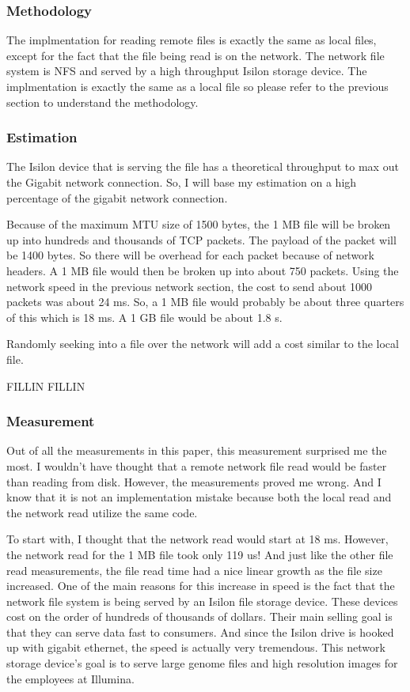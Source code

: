 \documentclass[paper=a4, fontsize=11pt]{scrartcl}
\numberwithin{equation}{section}        %
\numberwithin{figure}{section}          %
\numberwithin{table}{section}               %
\begin{document}
\subsubsection{Methodology}

The implmentation for reading remote files is exactly the same as local files, except for the fact that the file being read is on the network.  The network file system is NFS and served by a high throughput Isilon storage device.  The implmentation is exactly the same as a local file so please refer to the previous section to understand the methodology.

\subsubsection{Estimation}

The Isilon device that is serving the file has a theoretical throughput to max out the Gigabit network connection.  So, I will base my estimation on a high percentage of the gigabit network connection.

Because of the maximum MTU size of 1500 bytes, the 1 MB file will be broken up into hundreds and thousands of TCP packets.  The payload of the packet will be 1400 bytes.  So there will be overhead for each packet because of network headers.  A 1 MB file would then be broken up into about 750 packets.  Using the network speed in the previous network section, the cost to send about 1000 packets was about 24 ms.  So, a 1 MB file would probably be about three quarters of this which is 18 ms.  A 1 GB file would be about 1.8 s.

Randomly seeking into a file over the network will add a cost similar to the local file.

FILLIN FILLIN

\subsubsection{Measurement}

Out of all the measurements in this paper, this measurement surprised me the most.  I wouldn't have thought that a remote network file read would be faster than reading from disk.  However, the measurements proved me wrong.  And I know that it is not an implementation mistake because both the local read and the network read utilize the same code.

To start with, I thought that the network read would start at 18 ms.  However, the network read for the 1 MB file took only 119 us!  And just like the other file read measurements, the file read time had a nice linear growth as the file size increased.  One of the main reasons for this increase in speed is the fact that the network file system is being served by an Isilon file storage device.  These devices cost on the order of hundreds of thousands of dollars.  Their main selling goal is that they can serve data fast to consumers.  And since the Isilon drive is hooked up with gigabit ethernet, the speed is actually very tremendous.  This network storage device's goal is to serve large genome files and high resolution images for the employees at Illumina.
\end{document}
